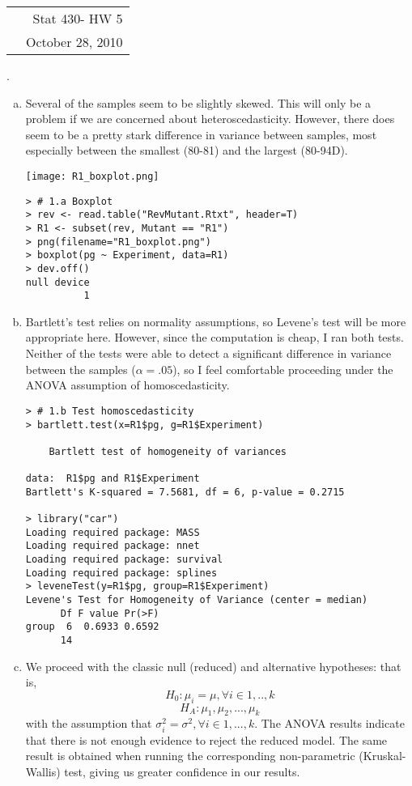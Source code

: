 \documentclass[a4paper, 10pt]{article}
\makeatletter
\newcommand{\class}{Stat 430}
\newcommand{\assignment}{HW 5}
\newcommand{\duedate}{October 28, 2010}
\newcounter{prob_num}
\newcommand{\problem}{\vspace{20pt}\arabic{prob_num}.\stepcounter{prob_num}\par}
\newcommand{\head}{\begin{center}\begin{tabular*}{\linewidth}{l@{\extracolsep{\fill}}r} & \class \;- \assignment \\ & \duedate \end{tabular*}\end{center} \hfill }
\makeatother
\begin{document}
 
\head
 
\problem

\begin{enumerate}[(a)]
\item Several of the samples seem to be slightly skewed. This will only be a problem if we are concerned about heteroscedasticity. However, there does seem to be a pretty stark difference in variance between samples, most especially between the smallest (80-81) and the largest (80-94D).

\begin{center}
  \texttt{[image: R1\_boxplot.png]}
\end{center}

\begin{verbatim}
> # 1.a Boxplot
> rev <- read.table("RevMutant.Rtxt", header=T)
> R1 <- subset(rev, Mutant == "R1")
> png(filename="R1_boxplot.png")
> boxplot(pg ~ Experiment, data=R1)
> dev.off()
null device 
          1
\end{verbatim}

\item Bartlett's test relies on normality assumptions, so Levene's test will be more appropriate here. However, since the computation is cheap, I ran both tests. Neither of the tests were able to detect a significant difference in variance between the samples ($\alpha = .05$), so I feel comfortable proceeding under the ANOVA assumption of homoscedasticity.

\begin{verbatim}
> # 1.b Test homoscedasticity
> bartlett.test(x=R1$pg, g=R1$Experiment)

	Bartlett test of homogeneity of variances

data:  R1$pg and R1$Experiment 
Bartlett's K-squared = 7.5681, df = 6, p-value = 0.2715

> library("car")
Loading required package: MASS
Loading required package: nnet
Loading required package: survival
Loading required package: splines
> leveneTest(y=R1$pg, group=R1$Experiment)
Levene's Test for Homogeneity of Variance (center = median)
      Df F value Pr(>F)
group  6  0.6933 0.6592
      14
\end{verbatim}

\item We proceed with the classic null (reduced) and alternative hypotheses: that is,
\[ H_0: \mu_i = \mu, \forall i \in 1,..,k \]
\[ H_A: \mu_1, \mu_2, ..., \mu_k \]
with the assumption that $\sigma^2_i = \sigma^2, \forall i \in 1,...,k$. The ANOVA results indicate that there is not enough evidence to reject the reduced model. The same result is obtained when running the corresponding non-parametric (Kruskal-Wallis) test, giving us greater confidence in our results.


\end{enumerate}
\end{document}

